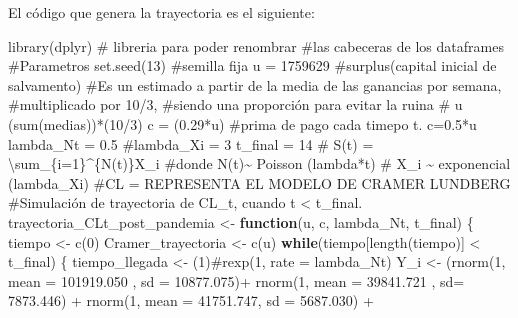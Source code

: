 \documentclass[
  us-letterpaper,
]{scrreprt}
\newenvironment{Shaded}{\begin{snugshade}}{\end{snugshade}}
\newcommand{\AttributeTok}[1]{\textcolor[rgb]{0.40,0.45,0.13}{#1}}
\newcommand{\CommentTok}[1]{\textcolor[rgb]{0.37,0.37,0.37}{#1}}
\newcommand{\ControlFlowTok}[1]{\textcolor[rgb]{0.00,0.23,0.31}{\textbf{#1}}}
\newcommand{\DecValTok}[1]{\textcolor[rgb]{0.68,0.00,0.00}{#1}}
\newcommand{\FloatTok}[1]{\textcolor[rgb]{0.68,0.00,0.00}{#1}}
\newcommand{\FunctionTok}[1]{\textcolor[rgb]{0.28,0.35,0.67}{#1}}
\newcommand{\NormalTok}[1]{\textcolor[rgb]{0.00,0.23,0.31}{#1}}
\newcommand{\OtherTok}[1]{\textcolor[rgb]{0.00,0.23,0.31}{#1}}
\newcommand{\SpecialCharTok}[1]{\textcolor[rgb]{0.37,0.37,0.37}{#1}}
\theoremstyle{definition}
\theoremstyle{plain}
\theoremstyle{plain}
\theoremstyle{remark}
\begin{document}
El código que genera la trayectoria es el siguiente:

\begin{Shaded}
\begin{Highlighting}[]
\FunctionTok{library}\NormalTok{(dplyr) }\CommentTok{\# libreria para poder renombrar }
\CommentTok{\#las cabeceras de los dataframes}
\CommentTok{\#Parametros}
\FunctionTok{set.seed}\NormalTok{(}\DecValTok{13}\NormalTok{) }\CommentTok{\#semilla fija}
\NormalTok{u }\OtherTok{=} \DecValTok{1759629} \CommentTok{\#surplus(capital inicial de salvamento)}
\CommentTok{\#Es un estimado a partir de la media de las ganancias por semana, }
\CommentTok{\#multiplicado por 10/3, }
\CommentTok{\#siendo una proporción para evitar la ruina}
\CommentTok{\# u (sum(medias))*(10/3)}
\NormalTok{c }\OtherTok{=}\NormalTok{ (}\FloatTok{0.29}\SpecialCharTok{*}\NormalTok{u) }\CommentTok{\#prima de pago cada timepo t. c=0.5*u}
\NormalTok{lambda\_Nt }\OtherTok{=} \FloatTok{0.5}
\CommentTok{\#lambda\_Xi = 3}
\NormalTok{t\_final }\OtherTok{=} \DecValTok{14}
\CommentTok{\# S(t) = \textbackslash{}sum\_\{i=1\}\^{}\{N(t)\}X\_i}
\CommentTok{\#donde N(t)\textasciitilde{} Poisson (lambda*t)}
\CommentTok{\# X\_i \textasciitilde{} exponencial (lambda\_Xi)}
\CommentTok{\#CL = REPRESENTA EL MODELO DE CRAMER LUNDBERG}
\CommentTok{\#Simulación de trayectoria de CL\_t, cuando t \textless{} t\_final.}
\NormalTok{trayectoria\_CLt\_post\_pandemia }\OtherTok{\textless{}{-}} \ControlFlowTok{function}\NormalTok{(u, c, lambda\_Nt, t\_final)}
\NormalTok{\{}
\NormalTok{  tiempo }\OtherTok{\textless{}{-}} \FunctionTok{c}\NormalTok{(}\DecValTok{0}\NormalTok{)}
\NormalTok{  Cramer\_trayectoria }\OtherTok{\textless{}{-}} \FunctionTok{c}\NormalTok{(u)}
  \ControlFlowTok{while}\NormalTok{(tiempo[}\FunctionTok{length}\NormalTok{(tiempo)] }\SpecialCharTok{\textless{}}\NormalTok{ t\_final)}
\NormalTok{  \{}
\NormalTok{    tiempo\_llegada }\OtherTok{\textless{}{-}}\NormalTok{ (}\DecValTok{1}\NormalTok{)}\CommentTok{\#rexp(1, rate = lambda\_Nt)}
\NormalTok{    Y\_i }\OtherTok{\textless{}{-}}\NormalTok{  (}\FunctionTok{rnorm}\NormalTok{(}\DecValTok{1}\NormalTok{, }\AttributeTok{mean =} \FloatTok{101919.050}\NormalTok{ , }\AttributeTok{sd =} \FloatTok{10877.075}\NormalTok{)}\SpecialCharTok{+}
             \FunctionTok{rnorm}\NormalTok{(}\DecValTok{1}\NormalTok{, }\AttributeTok{mean =}  \FloatTok{39841.721}\NormalTok{ , }\AttributeTok{sd=} \FloatTok{7873.446}\NormalTok{)  }\SpecialCharTok{+} 
             \FunctionTok{rnorm}\NormalTok{(}\DecValTok{1}\NormalTok{, }\AttributeTok{mean =}   \FloatTok{41751.747}\NormalTok{, }\AttributeTok{sd =} \FloatTok{5687.030}\NormalTok{) }\SpecialCharTok{+} 

\end{Highlighting}
\end{Shaded}
\end{document}

